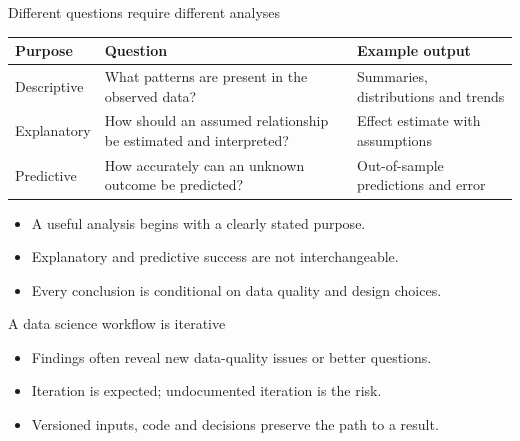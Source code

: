 \documentclass[10pt,aspectratio=169]{beamer}
\begin{document}
\begin{frame}{Different questions require different analyses}
\small
\begin{tabularx}{\textwidth}{lXX}
\toprule
\textbf{Purpose} & \textbf{Question} & \textbf{Example output} \\
\midrule
Descriptive & What patterns are present in the observed data? & Summaries, distributions and trends \\
Explanatory & How should an assumed relationship be estimated and interpreted? & Effect estimate with assumptions \\
Predictive & How accurately can an unknown outcome be predicted? & Out-of-sample predictions and error \\
\bottomrule
\end{tabularx}
\vspace{0.45cm}
\begin{itemize}
  \item A useful analysis begins with a clearly stated purpose.
  \item Explanatory and predictive success are not interchangeable.
  \item Every conclusion is conditional on data quality and design choices.
\end{itemize}
\end{frame}

\begin{frame}{A data science workflow is iterative}
\small
\centering
{}
\vspace{0.55cm}
\raggedright
\begin{itemize}
  \item Findings often reveal new data-quality issues or better questions.
  \item Iteration is expected; undocumented iteration is the risk.
  \item Versioned inputs, code and decisions preserve the path to a result.
\end{itemize}
\end{frame}
\end{document}
